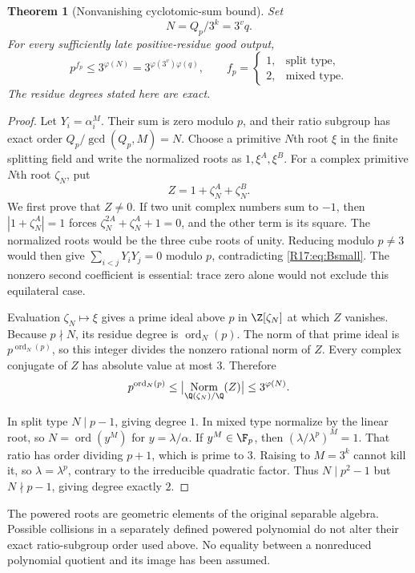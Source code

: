 \documentclass[11pt,a4paper]{article}
\newtheorem{theorem}{Theorem}[section]
\theoremstyle{definition}\newtheorem{definition}[theorem]{Definition}
\theoremstyle{remark}\newtheorem{remark}[theorem]{Remark}
\DeclareMathOperator{\Norm}{Norm}\DeclareMathOperator{\ord}{ord}\DeclareMathOperator{\Gal}{Gal}
\begin{document}
\begin{theorem}[Nonvanishing cyclotomic-sum bound]\label{R17:thm:cyclosum}
Set
\[
 N=Q_p/3^k=3^v q.
\]
For every sufficiently late positive-residue good output,
\begin{equation}\label{R17:eq:sum-bound}
 p^{f_p}\le3^{\varphi(N)}
       =3^{\varphi(3^v)\varphi(q)},
 \qquad
 f_p=\begin{cases}1,&\text{split type},\\2,&\text{mixed type}.
 \end{cases}
\end{equation}
The residue degrees stated here are exact.
\end{theorem}
\begin{proof}
Let $Y_i=\alpha_i^M$. Their sum is zero modulo $p$, and their ratio
subgroup has exact order $Q_p/\gcd(Q_p,M)=N$.
Choose a primitive $N$th root $\xi$ in the finite splitting field and
write the normalized roots as $1,\xi^A,\xi^B$.
For a complex primitive $N$th root $\zeta_N$, put
\[
 Z=1+\zeta_N^A+\zeta_N^B.
\]
We first prove that $Z\ne0$. If two unit complex numbers sum to $-1$,
then $|1+\zeta_N^A|=1$ forces
$\zeta_N^{2A}+\zeta_N^A+1=0$, and the other term is its square.
The normalized roots would be the three cube roots of unity. Reducing
modulo $p\ne3$ would then give $\sum_{i<j}Y_iY_j=0$ modulo $p$,
contradicting \eqref{R17:eq:Bsmall}. The nonzero second coefficient is
essential: trace zero alone would not exclude this equilateral case.

Evaluation $\zeta_N\mapsto\xi$ gives a prime ideal above $p$ in
$\Z[\zeta_N]$ at which $Z$ vanishes. Because $p\nmid N$, its residue
degree is $\ord_N(p)$. The norm of that prime ideal is
$p^{\ord_N(p)}$, so this integer divides the nonzero rational norm
of $Z$. Every complex conjugate of $Z$ has absolute value at most $3$.
Therefore
\[
 p^{\ord_N(p)}\le
 \bigl|\Norm_{\Q(\zeta_N)/\Q}(Z)\bigr|\le3^{\varphi(N)}.
\]

In split type $N\mid p-1$, giving degree $1$.
In mixed type normalize by the linear root, so $N=\ord(y^M)$ for
$y=\lambda/\alpha$. If $y^M\in\F_p$, then
$(\lambda/\lambda^p)^M=1$. That ratio has order dividing $p+1$,
which is prime to $3$. Raising to $M=3^k$ cannot kill it, so
$\lambda=\lambda^p$, contrary to the irreducible quadratic factor.
Thus $N\mid p^2-1$ but $N\nmid p-1$, giving degree exactly $2$.
\end{proof}

The powered roots are geometric elements of the original separable
algebra. Possible collisions in a separately defined powered polynomial
do not alter their exact ratio-subgroup order used above. No equality
between a nonreduced polynomial quotient and its image has been assumed.
\end{document}
